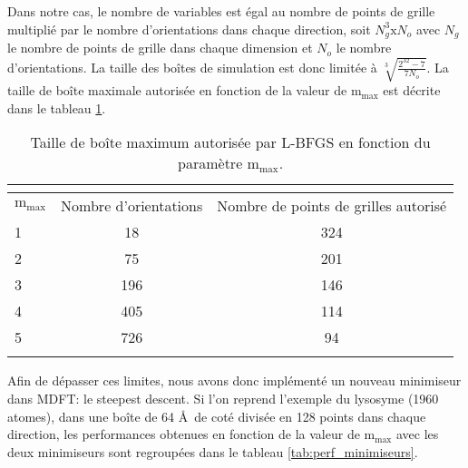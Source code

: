 Dans notre cas, le nombre de variables est égal au nombre de points de grille multiplié par le nombre d'orientations dans chaque direction, soit $N_g^3 \mathrm{x} N_o$ avec $N_g$ le nombre de points de grille dans chaque dimension et $N_o$ le nombre d'orientations. La taille des boîtes de simulation est donc limitée à $\sqrt[3]{\frac{2^{32}-7}{7N_o}}$. La taille de boîte maximale autorisée en fonction de la valeur de $\mathrm{m}_\mathrm{max}$ est décrite dans le tableau \ref{tab:taille_boîte_max}.



\begin{table}[ht]
 \centering
  \begin{tabular}{l | c | c}
    \hline \multicolumn{3}{c}{} \\[-1em]\hline
    $\mathrm{m}_\mathrm{max}$ & Nombre d'orientations & Nombre de points de grilles autorisé \\
    \hline
    1  & 18 & 324 \\
    2  & 75 & 201 \\
    3  & 196 & 146 \\
    4  & 405 & 114 \\
    5  & 726 & 94 \\
    \hline \multicolumn{3}{c}{} \\[-1em]\hline
  \end{tabular}
  \caption{Taille de boîte maximum autorisée par L-BFGS en fonction du paramètre $\mathrm{m}_\mathrm{max}$.}
  \label{tab:taille_boîte_max}  
\end{table}


Afin de dépasser ces limites, nous avons donc implémenté un nouveau minimiseur dans MDFT: le steepest descent. Si l'on reprend l'exemple du lysosyme (1960 atomes), dans une boîte de 64 \AA\ de coté divisée en 128 points dans chaque direction, les performances obtenues en fonction de la valeur de $\mathrm{m}_\mathrm{max}$ avec les deux minimiseurs sont regroupées dans le tableau \ref{tab:perf_minimiseurs}.




